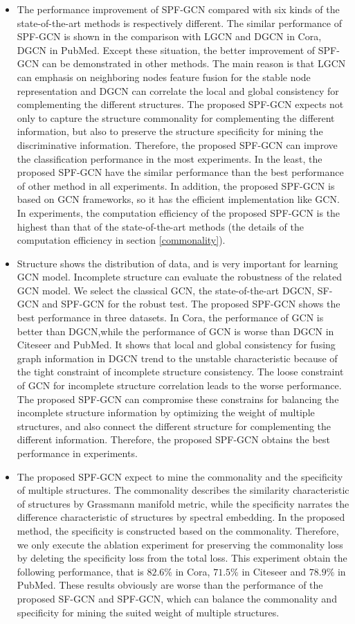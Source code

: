 \documentclass[review]{elsarticle}
\begin{document}
\begin{itemize}
\item The performance improvement of SPF-GCN compared with six kinds of the state-of-the-art methods is respectively different. The similar performance of SPF-GCN is shown in the comparison with LGCN and DGCN in Cora, DGCN in PubMed. Except these situation, the better improvement of SPF-GCN can be demonstrated in other methods. The main reason is that LGCN can emphasis on  neighboring nodes feature fusion for the stable node representation and DGCN can correlate the local and global consistency for complementing the different structures. The proposed SPF-GCN expects not only to capture the structure commonality for complementing the different information, but also to preserve the structure specificity for mining the discriminative information. Therefore, the proposed SPF-GCN can improve the classification performance in the most experiments. In the least, the proposed SPF-GCN have the similar performance than the best performance of other method in all experiments. In addition, the proposed SPF-GCN is based on GCN frameworks, so it has the efficient implementation like GCN. In experiments, the computation efficiency of the proposed SPF-GCN is the highest than that of the state-of-the-art methods (the details of the computation efficiency in section \ref{commonality}).
\item Structure shows the distribution of data, and is very important for learning GCN model. Incomplete structure can evaluate the robustness of the related GCN model. We select the classical GCN, the state-of-the-art DGCN, SF-GCN and SPF-GCN for the robust test. The proposed SPF-GCN shows the best performance in three datasets. In Cora, the performance of GCN is better than DGCN,while the performance of GCN is worse than DGCN in Citeseer and PubMed. It shows that local and global consistency for fusing graph information in DGCN trend to the unstable characteristic because of the tight constraint of incomplete structure consistency. The loose constraint of GCN for incomplete structure correlation leads to the worse performance. The proposed SPF-GCN can compromise these constrains for balancing the incomplete structure information by optimizing the weight of multiple structures, and also connect the different structure for complementing the different information. Therefore, the proposed SPF-GCN obtains the best performance in experiments.
\item The proposed SPF-GCN expect to mine the commonality and the specificity of multiple structures. The commonality describes the similarity characteristic of structures by Grassmann manifold metric, while the specificity narrates the difference characteristic of structures by spectral embedding. In the proposed method, the specificity is constructed based on the commonality. Therefore, we only execute the ablation experiment for preserving the commonality loss by deleting the specificity loss from the total loss. This experiment obtain the following performance, that is $82.6\%$ in Cora, $71.5\%$ in Citeseer and $78.9\%$ in PubMed. These results obviously are worse than the performance of the proposed SF-GCN and SPF-GCN, which can balance the commonality and specificity for mining the suited weight of multiple structures.



\end{itemize}
\end{document}
